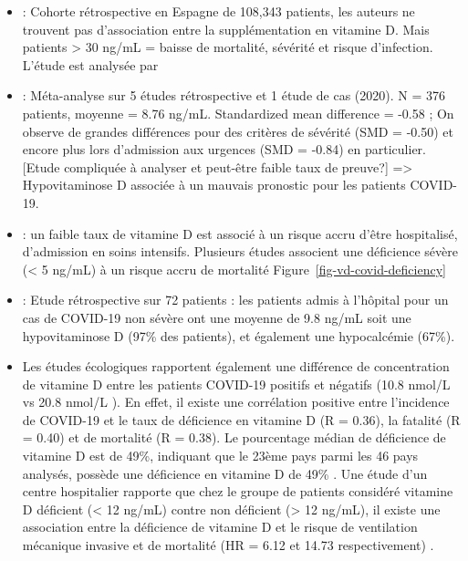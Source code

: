 \documentclass[
  a4paper,
  DIV=11,
  numbers=noendperiod,
  listof=totoc]{scrreprt}
\begin{document}
\begin{itemize}
\item
  \textcite{Oristrell.2022} : Cohorte rétrospective en Espagne de
  108,343 patients, les auteurs ne trouvent pas d'association entre la
  supplémentation en vitamine D. Mais patients \textgreater{} 30 ng/mL =
  baisse de mortalité, sévérité et risque d'infection. L'étude est
  analysée par \textcite{Sartini.2024}\\
\item
  \textcite{Munshi.2021} : Méta-analyse sur 5 études rétrospective et 1
  étude de cas (2020). N = 376 patients, moyenne = 8.76 ng/mL.
  Standardized mean difference = -0.58 ; On observe de grandes
  différences pour des critères de sévérité (SMD = -0.50) et encore plus
  lors d'admission aux urgences (SMD = -0.84) en particulier. {[}Etude
  compliquée à analyser et peut-être faible taux de preuve?{]}
  =\textgreater{} Hypovitaminose D associée à un mauvais pronostic pour
  les patients COVID-19.
\item
  \textcite{Campi.2021} : un faible taux de vitamine D est associé à un
  risque accru d'être hospitalisé, d'admission en soins intensifs.
  Plusieurs études associent une déficience sévère (\textless{} 5 ng/mL)
  à un risque accru de mortalité Figure~\ref{fig-vd-covid-deficiency}
\item
  \textcite{Pal.2021} : Etude rétrospective sur 72 patients : les
  patients admis à l'hôpital pour un cas de COVID-19 non sévère ont une
  moyenne de 9.8 ng/mL soit une hypovitaminose D (97\% des patients), et
  également une hypocalcémie (67\%).
\item
  Les études écologiques rapportent également une différence de
  concentration de vitamine D entre les patients COVID-19 positifs et
  négatifs (10.8 nmol/L vs 20.8 nmol/L \autocite{Baktash.2021}). En
  effet, il existe une corrélation positive entre l'incidence de
  COVID-19 et le taux de déficience en vitamine D (R = 0.36), la
  fatalité (R = 0.40) et de mortalité (R = 0.38). Le pourcentage médian
  de déficience de vitamine D est de 49\%, indiquant que le 23ème pays
  parmi les 46 pays analysés, possède une déficience en vitamine D de
  49\% \autocite{Mariani.2021}. Une étude d'un centre hospitalier
  rapporte que chez le groupe de patients considéré vitamine D déficient
  (\textless{} 12 ng/mL) contre non déficient (\textgreater{} 12 ng/mL),
  il existe une association entre la déficience de vitamine D et le
  risque de ventilation mécanique invasive et de mortalité (HR = 6.12 et
  14.73 respectivement) \autocite{Radujkovic.2020}.
\end{itemize}
\end{document}
